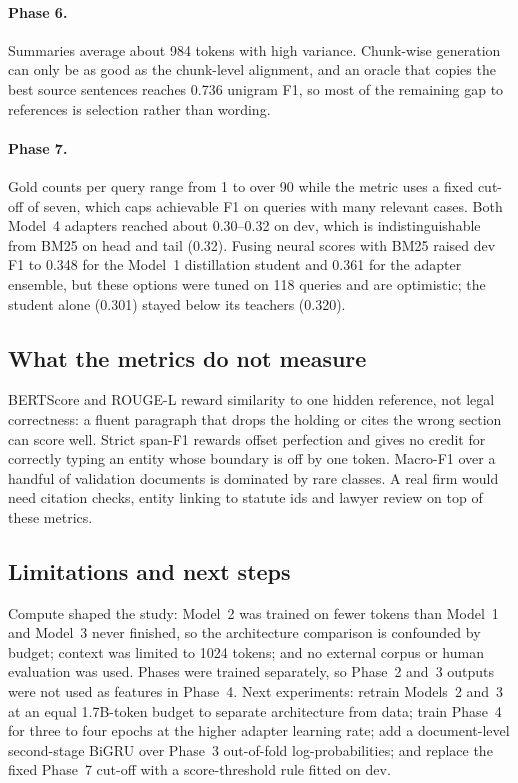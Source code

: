 \documentclass[11pt, oneside]{article}
\begin{document}
\paragraph{Phase 6.} Summaries average about 984 tokens with high variance. Chunk-wise generation can only be as good as the chunk-level alignment, and an oracle that copies the best source sentences reaches 0.736 unigram F1, so most of the remaining gap to references is selection rather than wording.

\paragraph{Phase 7.} Gold counts per query range from 1 to over 90 while the metric uses a fixed cut-off of seven, which caps achievable F1 on queries with many relevant cases. Both Model~4 adapters reached about 0.30--0.32 on dev, which is indistinguishable from BM25 on head and tail (0.32). Fusing neural scores with BM25 raised dev F1 to 0.348 for the Model~1 distillation student and 0.361 for the adapter ensemble, but these options were tuned on 118 queries and are optimistic; the student alone (0.301) stayed below its teachers (0.320).

\subsection{What the metrics do not measure}
BERTScore and ROUGE-L reward similarity to one hidden reference, not legal correctness: a fluent paragraph that drops the holding or cites the wrong section can score well. Strict span-F1 rewards offset perfection and gives no credit for correctly typing an entity whose boundary is off by one token. Macro-F1 over a handful of validation documents is dominated by rare classes. A real firm would need citation checks, entity linking to statute ids and lawyer review on top of these metrics.

\subsection{Limitations and next steps}
Compute shaped the study: Model~2 was trained on fewer tokens than Model~1 and Model~3 never finished, so the architecture comparison is confounded by budget; context was limited to 1024 tokens; and no external corpus or human evaluation was used. Phases were trained separately, so Phase~2 and~3 outputs were not used as features in Phase~4. Next experiments: retrain Models~2 and~3 at an equal 1.7B-token budget to separate architecture from data; train Phase~4 for three to four epochs at the higher adapter learning rate; add a document-level second-stage BiGRU over Phase~3 out-of-fold log-probabilities; and replace the fixed Phase~7 cut-off with a score-threshold rule fitted on dev.
\end{document}
